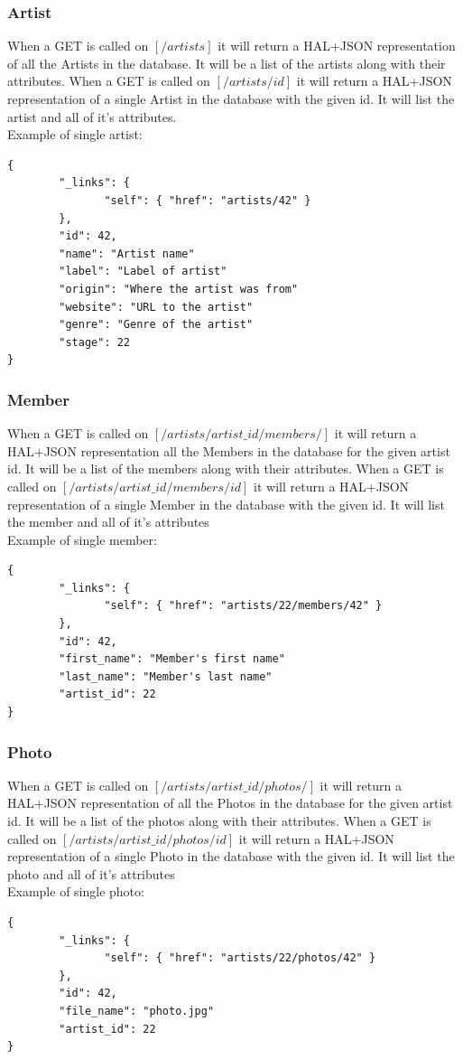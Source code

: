 \documentclass[12pt,english]{scrartcl}
\begin{document}
\subsubsection{Artist}
When a GET is called on $[/artists]$ it will return a HAL+JSON representation of all the Artists in the database.  It will be a list of the artists along with their attributes.
When a GET is called on $[/artists/{id}]$ it will return a HAL+JSON representation of a single Artist in the database with the given id.  It will list the artist and all of it's attributes.
\\
Example of single artist:
\begin{verbatim}
{
        "_links": {
               "self": { "href": "artists/42" }
        },
        "id": 42,
        "name": "Artist name"
        "label": "Label of artist"
        "origin": "Where the artist was from"
        "website": "URL to the artist"
        "genre": "Genre of the artist"
        "stage": 22
}
\end{verbatim}
\subsubsection{Member}
When a GET is called on $[/artists/{artist\_id}/members/]$ it will return a HAL+JSON representation all the Members in the database for the given artist id.  It will be a list of the members along with their attributes.
When a GET is called on $[/artists/{artist\_id}/members/{id}]$ it will return a HAL+JSON representation of a single Member in the database with the given id.  It will list the member and all of it's attributes
\\
Example of single member:
\begin{verbatim}
{
        "_links": {
               "self": { "href": "artists/22/members/42" }
        },
        "id": 42,
        "first_name": "Member's first name"
        "last_name": "Member's last name"
        "artist_id": 22
}
\end{verbatim}
\subsubsection{Photo}
When a GET is called on $[/artists/{artist\_id}/photos/]$ it will return a HAL+JSON representation of all the Photos in the database for the given artist id.  It will be a list of the photos along with their attributes.
When a GET is called on $[/artists/{artist\_id}/photos/{id}]$ it will return a HAL+JSON representation of a single Photo in the database with the given id.  It will list the photo and all of it's attributes
\\
Example of single photo:
\begin{verbatim}
{
        "_links": {
               "self": { "href": "artists/22/photos/42" }
        },
        "id": 42,
        "file_name": "photo.jpg"
        "artist_id": 22
}
\end{verbatim}
\end{document}
